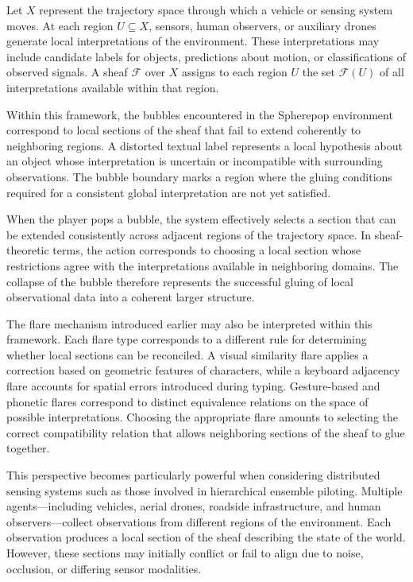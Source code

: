 \documentclass[11pt]{article}
\begin{document}
Let $X$ represent the trajectory space through which a vehicle or sensing system moves. At each region $U \subseteq X$, sensors, human observers, or auxiliary drones generate local interpretations of the environment. These interpretations may include candidate labels for objects, predictions about motion, or classifications of observed signals. A sheaf $\mathcal{F}$ over $X$ assigns to each region $U$ the set $\mathcal{F}(U)$ of all interpretations available within that region.

Within this framework, the bubbles encountered in the Spherepop environment correspond to local sections of the sheaf that fail to extend coherently to neighboring regions. A distorted textual label represents a local hypothesis about an object whose interpretation is uncertain or incompatible with surrounding observations. The bubble boundary marks a region where the gluing conditions required for a consistent global interpretation are not yet satisfied.

When the player pops a bubble, the system effectively selects a section that can be extended consistently across adjacent regions of the trajectory space. In sheaf-theoretic terms, the action corresponds to choosing a local section whose restrictions agree with the interpretations available in neighboring domains. The collapse of the bubble therefore represents the successful gluing of local observational data into a coherent larger structure.

The flare mechanism introduced earlier may also be interpreted within this framework. Each flare type corresponds to a different rule for determining whether local sections can be reconciled. A visual similarity flare applies a correction based on geometric features of characters, while a keyboard adjacency flare accounts for spatial errors introduced during typing. Gesture-based and phonetic flares correspond to distinct equivalence relations on the space of possible interpretations. Choosing the appropriate flare amounts to selecting the correct compatibility relation that allows neighboring sections of the sheaf to glue together.

This perspective becomes particularly powerful when considering distributed sensing systems such as those involved in hierarchical ensemble piloting. Multiple agents—including vehicles, aerial drones, roadside infrastructure, and human observers—collect observations from different regions of the environment. Each observation produces a local section of the sheaf describing the state of the world. However, these sections may initially conflict or fail to align due to noise, occlusion, or differing sensor modalities.
\end{document}
